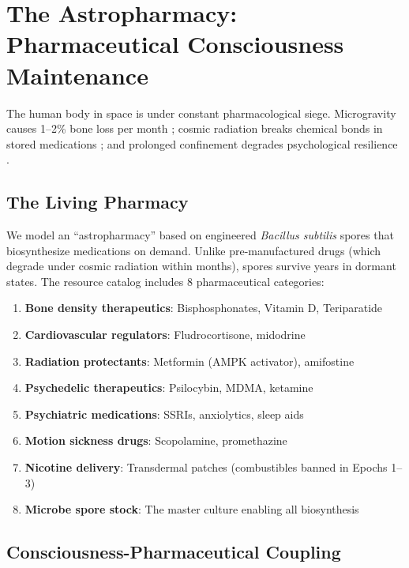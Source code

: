 \documentclass[12pt,a4paper]{article}
\begin{document}
\section{The Astropharmacy: Pharmaceutical Consciousness Maintenance}
\label{sec:astropharmacy}

The human body in space is under constant pharmacological siege. Microgravity causes 1--2\% bone loss per month \citep{sibonga2015spaceflight}; cosmic radiation breaks chemical bonds in stored medications \citep{chancellor2014space}; and prolonged confinement degrades psychological resilience \citep{basner2014mars}.

\subsection{The Living Pharmacy}

We model an ``astropharmacy'' based on engineered \textit{Bacillus subtilis} spores that biosynthesize medications on demand. Unlike pre-manufactured drugs (which degrade under cosmic radiation within months), spores survive years in dormant states. The resource catalog includes 8 pharmaceutical categories:

\begin{enumerate}    \item \textbf{Bone density therapeutics}: Bisphosphonates, Vitamin D, Teriparatide
    \item \textbf{Cardiovascular regulators}: Fludrocortisone, midodrine
    \item \textbf{Radiation protectants}: Metformin (AMPK activator), amifostine
    \item \textbf{Psychedelic therapeutics}: Psilocybin, MDMA, ketamine
    \item \textbf{Psychiatric medications}: SSRIs, anxiolytics, sleep aids
    \item \textbf{Motion sickness drugs}: Scopolamine, promethazine
    \item \textbf{Nicotine delivery}: Transdermal patches (combustibles banned in Epochs 1--3)
    \item \textbf{Microbe spore stock}: The master culture enabling all biosynthesis
\end{enumerate}

\subsection{Consciousness-Pharmaceutical Coupling}
\end{document}
